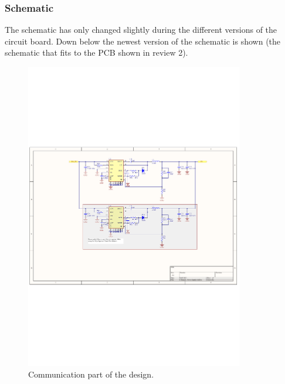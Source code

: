 \subsubsection{Schematic}
The schematic has only changed slightly during the different versions of the circuit board. Down below the newest version of the schematic is shown (the schematic that fits to the PCB shown in review 2).
\begin{figure}[H]
	\begin{centering}
		 \includegraphics[width=0.85\textwidth,page=2,angle=0]{images/SIG60_v0_4}
		\caption{Communication part of the design.}
	\end{centering}
\end{figure}

